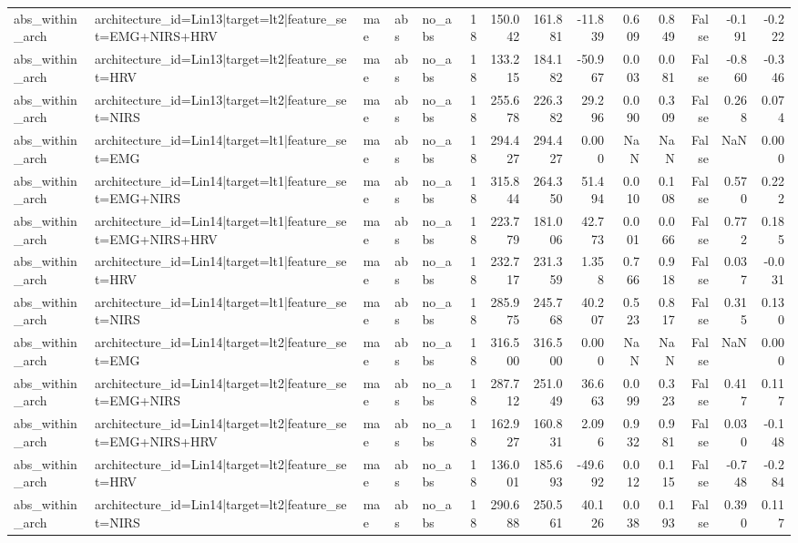 \begin{table}
\begin{tabular}{lllllrrrrrrrrr}
abs_within_arch & architecture_id=Lin13|target=lt2|feature_set=EMG+NIRS+HRV & mae & abs & no_abs & 18 & 150.042 & 161.881 & -11.839 & 0.609 & 0.849 & False & -0.191 & -0.222 \\
abs_within_arch & architecture_id=Lin13|target=lt2|feature_set=HRV & mae & abs & no_abs & 18 & 133.215 & 184.182 & -50.967 & 0.003 & 0.081 & False & -0.860 & -0.346 \\
abs_within_arch & architecture_id=Lin13|target=lt2|feature_set=NIRS & mae & abs & no_abs & 18 & 255.678 & 226.382 & 29.296 & 0.090 & 0.309 & False & 0.268 & 0.074 \\
abs_within_arch & architecture_id=Lin14|target=lt1|feature_set=EMG & mae & abs & no_abs & 18 & 294.427 & 294.427 & 0.000 & NaN & NaN & False & NaN & 0.000 \\
abs_within_arch & architecture_id=Lin14|target=lt1|feature_set=EMG+NIRS & mae & abs & no_abs & 18 & 315.844 & 264.350 & 51.494 & 0.010 & 0.108 & False & 0.570 & 0.222 \\
abs_within_arch & architecture_id=Lin14|target=lt1|feature_set=EMG+NIRS+HRV & mae & abs & no_abs & 18 & 223.779 & 181.006 & 42.773 & 0.001 & 0.066 & False & 0.772 & 0.185 \\
abs_within_arch & architecture_id=Lin14|target=lt1|feature_set=HRV & mae & abs & no_abs & 18 & 232.717 & 231.359 & 1.358 & 0.766 & 0.918 & False & 0.037 & -0.031 \\
abs_within_arch & architecture_id=Lin14|target=lt1|feature_set=NIRS & mae & abs & no_abs & 18 & 285.975 & 245.768 & 40.207 & 0.523 & 0.817 & False & 0.315 & 0.130 \\
abs_within_arch & architecture_id=Lin14|target=lt2|feature_set=EMG & mae & abs & no_abs & 18 & 316.500 & 316.500 & 0.000 & NaN & NaN & False & NaN & 0.000 \\
abs_within_arch & architecture_id=Lin14|target=lt2|feature_set=EMG+NIRS & mae & abs & no_abs & 18 & 287.712 & 251.049 & 36.663 & 0.099 & 0.323 & False & 0.417 & 0.117 \\
abs_within_arch & architecture_id=Lin14|target=lt2|feature_set=EMG+NIRS+HRV & mae & abs & no_abs & 18 & 162.927 & 160.831 & 2.096 & 0.932 & 0.981 & False & 0.030 & -0.148 \\
abs_within_arch & architecture_id=Lin14|target=lt2|feature_set=HRV & mae & abs & no_abs & 18 & 136.001 & 185.693 & -49.692 & 0.012 & 0.115 & False & -0.748 & -0.284 \\
abs_within_arch & architecture_id=Lin14|target=lt2|feature_set=NIRS & mae & abs & no_abs & 18 & 290.688 & 250.561 & 40.126 & 0.038 & 0.193 & False & 0.390 & 0.117 \\

\end{tabular}
\end{table}
